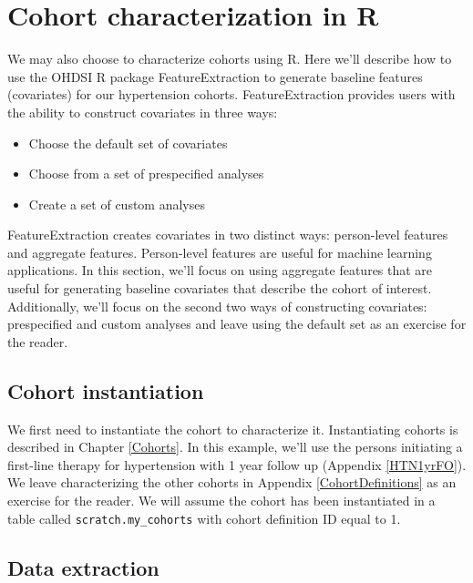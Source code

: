 \documentclass[11pt]{book}
\providecommand{\tightlist}{%
  \setlength{\itemsep}{0pt}\setlength{\parskip}{0pt}}
\theoremstyle{definition}
\theoremstyle{definition}
\theoremstyle{definition}
\theoremstyle{remark}
\begin{document}
\hypertarget{cohort-characterization-in-r}{%
\section{Cohort characterization in R}\label{cohort-characterization-in-r}}

We may also choose to characterize cohorts using R. Here we'll describe how to use the OHDSI R package FeatureExtraction to generate baseline features (covariates) for our hypertension cohorts. FeatureExtraction provides users with the ability to construct covariates in three ways:

\begin{itemize}
\tightlist
\item
  Choose the default set of covariates
\item
  Choose from a set of prespecified analyses
\item
  Create a set of custom analyses
\end{itemize}

FeatureExtraction creates covariates in two distinct ways: person-level features and aggregate features. Person-level features are useful for machine learning applications. In this section, we'll focus on using aggregate features that are useful for generating baseline covariates that describe the cohort of interest. Additionally, we'll focus on the second two ways of constructing covariates: prespecified and custom analyses and leave using the default set as an exercise for the reader.

\hypertarget{cohort-instantiation}{%
\subsection{Cohort instantiation}\label{cohort-instantiation}}

We first need to instantiate the cohort to characterize it. Instantiating cohorts is described in Chapter \ref{Cohorts}. In this example, we'll use the persons initiating a first-line therapy for hypertension with 1 year follow up (Appendix \ref{HTN1yrFO}). We leave characterizing the other cohorts in Appendix \ref{CohortDefinitions} as an exercise for the reader. We will assume the cohort has been instantiated in a table called \texttt{scratch.my\_cohorts} with cohort definition ID equal to 1.

\hypertarget{data-extraction}{%
\subsection{Data extraction}\label{data-extraction}}
\end{document}
